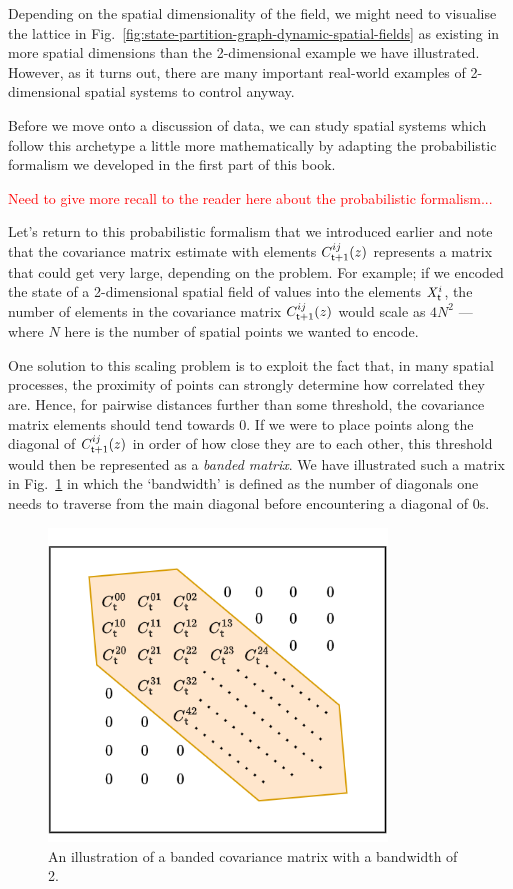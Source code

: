 Depending on the spatial dimensionality of the field, we might need to visualise the lattice in Fig.~\ref{fig:state-partition-graph-dynamic-spatial-fields} as existing in more spatial dimensions than the 2-dimensional example we have illustrated. However, as it turns out, there are many important real-world examples of 2-dimensional spatial systems to control anyway. 

Before we move onto a discussion of data, we can study spatial systems which follow this archetype a little more mathematically by adapting the probabilistic formalism we developed in the first part of this book. 

\textcolor{red}{Need to give more recall to the reader here about the probabilistic formalism...}

Let's return to this probabilistic formalism that we introduced earlier and note that the covariance matrix estimate with elements $C^{ij}_{{\sf t}+1}(z)$ represents a matrix that could get very large, depending on the problem. For example; if we encoded the state of a 2-dimensional spatial field of values into the elements $X^i_{\sf t}$, the number of elements in the covariance matrix $C^{ij}_{{\sf t}+1}(z)$ would scale as $4N^2$ --- where $N$ here is the number of spatial points we wanted to encode. 

One solution to this scaling problem is to exploit the fact that, in many spatial processes, the proximity of points can strongly determine how correlated they are. Hence, for pairwise distances further than some threshold, the covariance matrix elements should tend towards 0. If we were to place points along the diagonal of $C^{ij}_{{\sf t}+1}(z)$ in order of how close they are to each other, this threshold would then be represented as a \emph{banded matrix}. We have illustrated such a matrix in Fig.~\ref{fig:banded-matrix} in which the `bandwidth' is defined as the number of diagonals one needs to traverse from the main diagonal before encountering a diagonal of 0s.

\begin{figure}[h]
\centering
\includegraphics[width=9cm]{images/chapter-7-banded-matrix.drawio.png}
\caption{An illustration of a banded covariance matrix with a bandwidth of 2.}
\label{fig:banded-matrix}
\end{figure}

